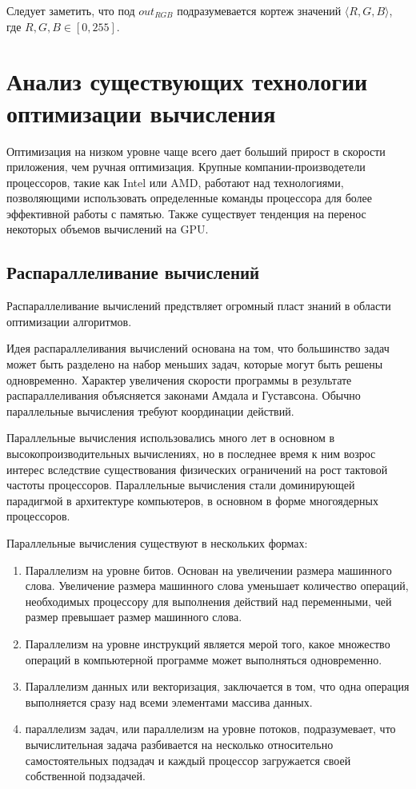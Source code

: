 Следует заметить, что под $out_{RGB}$  подразумевается кортеж значений $\langle R, G, B\rangle$, где $R, G, B \in [0, 255]$.

\section{Анализ существующих технологии оптимизации вычисления}
Оптимизация на низком уровне чаще всего дает больший прирост в скорости приложения, чем ручная оптимизация. Крупные компании-производетели процессоров, такие как Intel или AMD, работают над технологиями, позволяющими использовать определенные команды процессора для более эффективной работы с памятью. Также существует тенденция на перенос некоторых объемов вычислений на GPU. 

\subsection{Распараллеливание вычислений}
Распараллеливание вычислений предствляет огромный пласт знаний в области оптимизации алгоритмов. 

Идея распараллеливания вычислений основана на том, что большинство задач может быть разделено на набор меньших задач, которые могут быть решены одновременно. Характер увеличения скорости программы в результате распараллеливания объясняется законами Амдала и Густавсона. Обычно параллельные вычисления требуют координации действий.  

Параллельные вычисления использовались много лет в основном в высокопроизводительных вычислениях, но в последнее время к ним возрос интерес вследствие существования физических ограничений на рост тактовой частоты процессоров. Параллельные вычисления стали доминирующей парадигмой в архитектуре компьютеров, в основном в форме многоядерных процессоров.\cite{bib3}

Параллельные вычисления существуют в нескольких формах: 
\begin{enumerate}
\item Параллелизм на уровне битов. Основан на увеличении размера машинного слова. Увеличение размера машинного слова уменьшает количество операций, необходимых процессору для выполнения действий над переменными, чей размер превышает размер машинного слова.
\item Параллелизм на уровне инструкций является мерой того, какое множество операций в компьютерной программе может выполняться одновременно. 
\item Параллелизм данных или векторизация, заключается в том, что одна операция выполняется сразу над всеми элементами массива данных.
\item параллелизм задач, или параллелизм на уровне потоков, подразумевает, что вычислительная задача разбивается на несколько относительно самостоятельных подзадач и каждый процессор загружается своей собственной подзадачей.
\end{enumerate}

